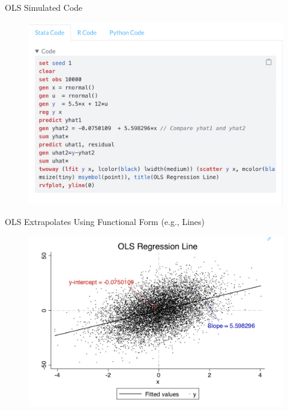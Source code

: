 \documentclass{beamer}
\begin{document}
\begin{frame}{OLS Simulated Code}

\begin{figure}[!t]\centering
\includegraphics[scale=0.40]{./lecture_includes/ols_code}
\end{figure}

\end{frame}

\begin{frame}{OLS Extrapolates Using Functional Form (e.g., Lines)}

\begin{figure}[!t]\centering
\includegraphics[scale=0.4]{./lecture_includes/ols_line}
\end{figure}

\end{frame}
\end{document}
